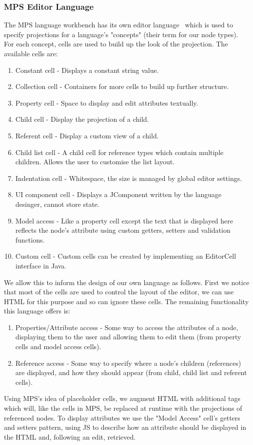 \documentclass{article}
\begin{document}
{\subsubsection{MPS Editor Language}
The MPS language workbench has its own editor language~\cite{mpsEditorLanguage} which is used to specify projections for a language's "concepts" (their term for our node types). For each concept, cells are used to build up the look of the projection. The available cells are:
\begin{enumerate}
\item Constant cell - Displays a constant string value.
\item Collection cell - Containers for more cells to build up further structure.
\item Property cell - Space to display and edit attributes textually.
\item Child cell - Display the projection of a child.
\item Referent cell - Display a custom view of a child.
\item Child list cell - A child cell for reference types which contain multiple children. Allows the user to customise the list layout.
\item Indentation cell - Whitespace, the size is managed by global editor settings.
\item UI component cell - Displays a JComponent written by the language desinger, cannot store state.
\item Model access - Like a property cell except the text that is displayed here reflects the node's attribute using custom getters, setters and validation functions.
\item Custom cell - Custom cells can be created by implementing an EditorCell interface in Java.
\end{enumerate}
%
We allow this to inform the design of our own language as follows. First we notice that most of the cells are used to control the layout of the editor, we can use HTML for this purpose and so can ignore these cells. The remaining functionality this language offers is:
\begin{enumerate}
\item Properties/Attribute access - Some way to access the attributes of a node, displaying them to the user and allowing them to edit them  (from property cells and model access cells).
\item Reference access - Some way to specify where a node's children (references) are displayed, and how they should appear (from child, child list and referent cells).
\end{enumerate}
Using MPS's idea of placeholder cells, we augment HTML with additional tags which will, like the cells in MPS, be replaced at runtime with the projections of referenced nodes. To display attributes we use the "Model Access" cell's getters and setters pattern, using JS to describe how an attribute should be displayed in the HTML and, following an edit, retrieved. 

}
\end{document}
